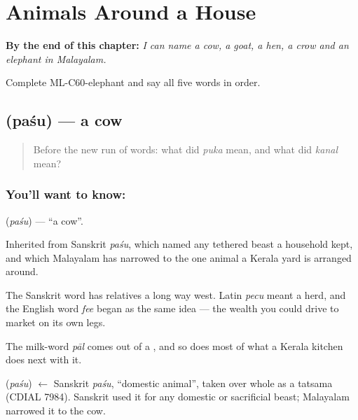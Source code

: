 
\chapter{Animals Around a House}
\label{ch:ml-animals-around-a-house}

\begin{chapteropening}
\textbf{By the end of this chapter:} \emph{I can name a cow, a goat, a hen, a crow and an elephant in Malayalam.}

Complete ML-C60-elephant and say all five words in order.
\end{chapteropening}

\section[\texorpdfstring{\ml{പശു} (paśu)}{പശു (paśu)}]{ (paśu) — a cow}

\label{lesson:ML-C60-cow}



\begin{quote}
Before the new run of words: what did \emph{puka} mean, and what did \emph{kanal} mean?
\end{quote}

\subsection*{You'll want to know: }
\textbf{} (\emph{paśu}) — \textquotedblleft{}a cow\textquotedblright{}.

Inherited from Sanskrit \emph{paśu}, which named any tethered beast a household kept, and which Malayalam has narrowed to the one animal a Kerala yard is arranged around.

The Sanskrit word has relatives a long way west. Latin \emph{pecu} meant a herd, and the English word \emph{fee} began as the same idea — the wealth you could drive to market on its own legs.

The milk-word \emph{pāl} comes out of a , and so does most of what a Kerala kitchen does next with it.

\begin{cousinweb}
\textbf{} (\emph{paśu}) $\leftarrow$ Sanskrit \emph{paśu}, \textquotedblleft{}domestic animal\textquotedblright{}, taken over whole as a tatsama (CDIAL 7984). Sanskrit used it for any domestic or sacrificial beast; Malayalam narrowed it to the cow.
\end{cousinweb}

